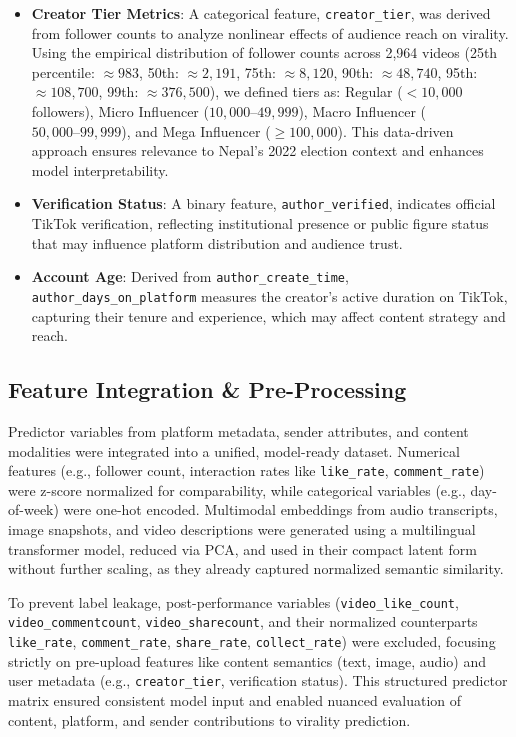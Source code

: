 \documentclass[12pt,a4paper]{report}
\begin{document}
\begin{itemize}
    \item \textbf{Creator Tier Metrics}: A categorical feature, \texttt{creator\_tier}, was derived from follower counts to analyze nonlinear effects of audience reach on virality. Using the empirical distribution of follower counts across 2,964 videos (25th percentile: $\approx 983$, 50th: $\approx 2,191$, 75th: $\approx 8,120$, 90th: $\approx 48,740$, 95th: $\approx 108,700$, 99th: $\approx 376,500$), we defined tiers as: Regular ($< 10,000$ followers), Micro Influencer ($10,000–49,999$), Macro Influencer ($50,000–99,999$), and Mega Influencer ($\geq 100,000$). This data-driven approach ensures relevance to Nepal’s 2022 election context and enhances model interpretability.
\newpage
    \item \textbf{Verification Status}: A binary feature, \texttt{author\_verified}, indicates official TikTok verification, reflecting institutional presence or public figure status that may influence platform distribution and audience trust.
    
    \item \textbf{Account Age}: Derived from \texttt{author\_create\_time}, \texttt{author\_days\_on\_platform} measures the creator’s active duration on TikTok, capturing their tenure and experience, which may affect content strategy and reach.
\end{itemize}
\newpage
\subsection{Feature Integration \& Pre-Processing}

Predictor variables from platform metadata, sender attributes, and content modalities were integrated into a unified, model-ready dataset. Numerical features (e.g., follower count, interaction rates like \texttt{like\_rate}, \texttt{comment\_rate}) were z-score normalized for comparability, while categorical variables (e.g., day-of-week) were one-hot encoded. Multimodal embeddings from audio transcripts, image snapshots, and video descriptions were generated using a multilingual transformer model, reduced via PCA, and used in their compact latent form without further scaling, as they already captured normalized semantic similarity.

To prevent label leakage, post-performance variables (\texttt{video\_like\_count}, \texttt{video\_commentcount}, \texttt{video\_sharecount}, and their normalized counterparts \texttt{like\_rate}, \texttt{comment\_rate}, \texttt{share\_rate}, \texttt{collect\_rate}) were excluded, focusing strictly on pre-upload features like content semantics (text, image, audio) and user metadata (e.g., \texttt{creator\_tier}, verification status). This structured predictor matrix ensured consistent model input and enabled nuanced evaluation of content, platform, and sender contributions to virality prediction.
\end{document}
